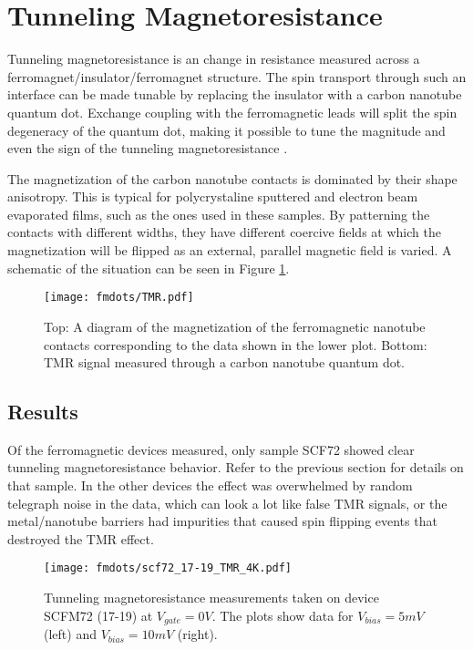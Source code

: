 \section{Tunneling Magnetoresistance}
\label{sec:TMR}

Tunneling magnetoresistance is an change in resistance measured across a ferromagnet/insulator/ferromagnet structure. The spin transport through such an interface can be made tunable by replacing the insulator with a carbon nanotube quantum dot. Exchange coupling with the ferromagnetic leads will split the spin degeneracy of the quantum dot, making it possible to tune the magnitude and even the sign of the tunneling magnetoresistance \cite{Tsymbal2003, Sahoo2005, Thamankar2006}.

The magnetization of the carbon nanotube contacts is dominated by their shape anisotropy. This is typical for polycrystaline sputtered and electron beam evaporated films, such as the ones used in these samples. By patterning the contacts with different widths, they have different coercive fields at which the magnetization will be flipped as an external, parallel magnetic field is varied. A schematic of the situation can be seen in Figure \ref{fig:spin_valve}.

\begin{figure}
    \centering
    \texttt{[image: fmdots/TMR.pdf]}
    \caption{Top: A diagram of the magnetization of the ferromagnetic nanotube contacts corresponding to the data shown in the lower plot. Bottom: TMR signal measured through a carbon nanotube quantum dot.}
    \label{fig:spin_valve}
\end{figure}

\subsection{Results}

Of the ferromagnetic devices measured, only sample SCF72 showed clear tunneling magnetoresistance behavior. Refer to the previous section for details on that sample. In the other devices the effect was overwhelmed by random telegraph noise in the data, which can look a lot like false TMR signals, or the metal/nanotube barriers had impurities that caused spin flipping events that destroyed the TMR effect.

\begin{figure}
    \centering
    \texttt{[image: fmdots/scf72\_17-19\_TMR\_4K.pdf]}
    \caption{Tunneling magnetoresistance measurements taken on device SCFM72 (17-19) at $V_{gate} = 0V$. The plots show data for $V_{bias} = 5mV$ (left) and $V_{bias} = 10mV$ (right).}
    \label{fig:TMR_real}
\end{figure}

